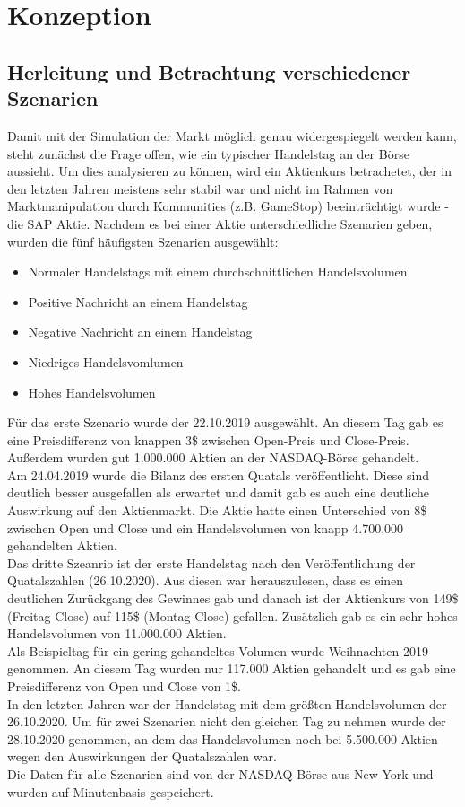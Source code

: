 \chapter{Konzeption}
\section{Herleitung und Betrachtung verschiedener Szenarien}\label{sec:szenarien}
Damit mit der Simulation der Markt möglich genau widergespiegelt werden kann, steht zunächst die Frage offen,
wie ein typischer Handelstag an der Börse aussieht. Um dies analysieren zu können, wird ein Aktienkurs betrachetet, 
der in den letzten Jahren meistens sehr stabil war und nicht im Rahmen von Marktmanipulation durch Kommunities 
(z.B. GameStop) beeinträchtigt wurde - die SAP Aktie. Nachdem es bei einer Aktie unterschiedliche Szenarien geben, 
wurden die fünf häufigsten Szenarien ausgewählt:
\begin{itemize}
    \item Normaler Handelstags mit einem durchschnittlichen Handelsvolumen
    \item Positive Nachricht an einem Handelstag
    \item Negative Nachricht an einem Handelstag
    \item Niedriges Handelsvomlumen 
    \item Hohes Handelsvolumen
\end{itemize}
Für das erste Szenario wurde der 22.10.2019 ausgewählt. An diesem Tag gab es eine Preisdifferenz von knappen 3\$ 
zwischen Open-Preis und Close-Preis. Außerdem wurden gut 1.000.000 Aktien an der NASDAQ-Börse gehandelt. \\
Am 24.04.2019 wurde die Bilanz des ersten Quatals veröffentlicht. Diese sind deutlich besser ausgefallen als erwartet 
und damit gab es auch eine deutliche Auswirkung auf den Aktienmarkt. Die Aktie hatte einen Unterschied von 8\$ zwischen 
Open und Close und ein Handelsvolumen von knapp 4.700.000 gehandelten Aktien. \\
Das dritte Szeanrio ist der erste Handelstag nach den Veröffentlichung der Quatalszahlen (26.10.2020). Aus diesen war 
herauszulesen, dass es einen deutlichen Zurückgang des Gewinnes gab und danach ist der Aktienkurs von 149\$ (Freitag Close) 
auf 115\$ (Montag Close) gefallen. Zusätzlich gab es ein sehr hohes Handelsvolumen von 11.000.000 Aktien. \\
Als Beispieltag für ein gering gehandeltes Volumen wurde Weihnachten 2019 genommen. An diesem Tag wurden nur 117.000 Aktien gehandelt 
und es gab eine Preisdifferenz von Open und Close von 1\$. \\
In den letzten Jahren war der Handelstag mit dem größten Handelsvolumen der 26.10.2020. Um für zwei Szenarien nicht den gleichen 
Tag zu nehmen wurde der 28.10.2020 genommen, an dem das Handelsvolumen noch bei 5.500.000 Aktien wegen den Auswirkungen der 
Quatalszahlen war. \\
Die Daten für alle Szenarien sind von der NASDAQ-Börse aus New York und wurden auf Minutenbasis gespeichert. 

